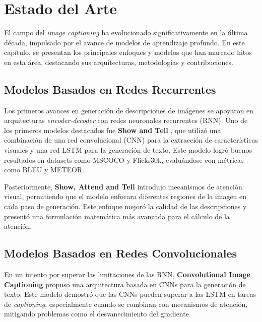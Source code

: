  
\chapter{Estado del Arte}\label{chapter:estadoarte}

El campo del \textit{image captioning} ha evolucionado significativamente en la última década, impulsado por el avance de modelos de aprendizaje profundo. En este capítulo, se presentan los principales enfoques y modelos que han marcado hitos en esta área, destacando sus arquitecturas, metodologías y contribuciones.

\section{Modelos Basados en Redes Recurrentes}

Los primeros avances en generación de descripciones de imágenes se apoyaron en arquitecturas \textit{encoder-decoder} con redes neuronales recurrentes (RNN). Uno de los primeros modelos destacados fue \textbf{Show and Tell} \cite{vinyals2015show}, que utilizó una combinación de una red convolucional (CNN) para la extracción de características visuales y una red LSTM para la generación de texto. Este modelo logró buenos resultados en datasets como MSCOCO y Flickr30k, evaluándose con métricas como BLEU y METEOR.

Posteriormente, \textbf{Show, Attend and Tell} \cite{xu2015show} introdujo mecanismos de atención visual, permitiendo que el modelo enfocara diferentes regiones de la imagen en cada paso de generación. Este enfoque mejoró la calidad de las descripciones y presentó una formulación matemática más avanzada para el cálculo de la atención.

\section{Modelos Basados en Redes Convolucionales}

En un intento por superar las limitaciones de las RNN, \textbf{Convolutional Image Captioning} \cite{aneja2018convcap} propuso una arquitectura basada en CNNs para la generación de texto. Este modelo demostró que las CNNs pueden superar a las LSTM en tareas de \textit{captioning}, especialmente cuando se combinan con mecanismos de atención, mitigando problemas como el desvanecimiento del gradiente.

